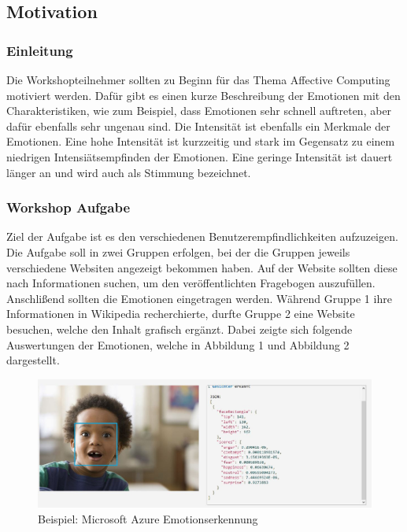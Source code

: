 \subsection{Motivation}


\subsubsection{Einleitung}

Die Workshopteilnehmer sollten zu Beginn für das Thema Affective Computing motiviert werden. Dafür gibt es einen kurze Beschreibung der Emotionen mit den Charakteristiken, wie zum Beispiel, dass Emotionen sehr schnell auftreten, aber dafür ebenfalls sehr ungenau sind. Die Intensität ist ebenfalls ein Merkmale der Emotionen. Eine hohe Intensität ist kurzzeitig und stark im Gegensatz zu einem niedrigen Intensiätsempfinden der Emotionen. Eine geringe Intensität ist dauert länger an und wird auch als Stimmung bezeichnet. 

\subsubsection{Workshop Aufgabe}\label{Workshop Aufgabe}



Ziel der Aufgabe ist es den verschiedenen Benutzerempfindlichkeiten aufzuzeigen. Die Aufgabe soll in zwei Gruppen erfolgen, bei der die Gruppen jeweils verschiedene Websiten angezeigt bekommen haben. Auf der Website sollten diese nach Informationen suchen, um den veröffentlichten Fragebogen auszufüllen. Anschlißend sollten die Emotionen eingetragen werden. Während Gruppe 1 ihre Informationen in Wikipedia recherchierte, durfte Gruppe 2 eine Website besuchen, welche den Inhalt grafisch ergänzt. Dabei zeigte sich folgende Auswertungen der Emotionen, welche in Abbildung 1 und Abbildung 2 dargestellt.

\begin{figure}[!h]
	\centering
	\includegraphics[width=0.9\linewidth]{Pictures/Microsoft_Gestenerkennung}
	\caption[Beispiel: Microsoft Azure Emotionserkennung]{Beispiel: Microsoft Azure Emotionserkennung \cite{MicrosoftAzure}}
	\label{fig:microsoftgestenerkennung}
\end{figure}
